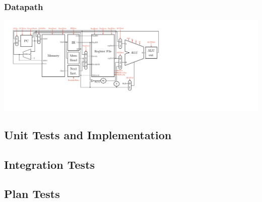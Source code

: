 \documentclass{article}
\begin{document}
\begin{landscape}
		\subsubsection{Datapath}
			\begin{center}
				\includegraphics[width=22.5cm]{datapath}
			\end{center}
		\end{landscape}
	\subsection{Unit Tests and Implementation}
	\subsection{Integration Tests}
	\subsection{Plan Tests}
\end{document}

